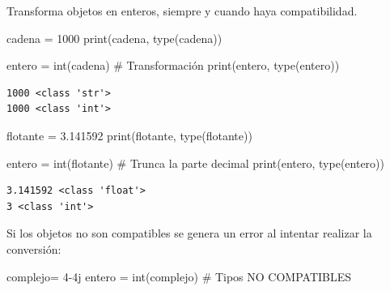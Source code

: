 \documentclass[
  spanish,
  letterpaper,
]{scrbook}
\newenvironment{Shaded}{\begin{snugshade}}{\end{snugshade}}
\newcommand{\BuiltInTok}[1]{\textcolor[rgb]{0.00,0.23,0.31}{#1}}
\newcommand{\CommentTok}[1]{\textcolor[rgb]{0.37,0.37,0.37}{#1}}
\newcommand{\DecValTok}[1]{\textcolor[rgb]{0.68,0.00,0.00}{#1}}
\newcommand{\FloatTok}[1]{\textcolor[rgb]{0.68,0.00,0.00}{#1}}
\newcommand{\NormalTok}[1]{\textcolor[rgb]{0.00,0.23,0.31}{#1}}
\newcommand{\OperatorTok}[1]{\textcolor[rgb]{0.37,0.37,0.37}{#1}}
\newcommand{\OtherTok}[1]{\textcolor[rgb]{0.00,0.23,0.31}{#1}}
\newcommand{\StringTok}[1]{\textcolor[rgb]{0.13,0.47,0.30}{#1}}
\theoremstyle{definition}
\theoremstyle{remark}
\begin{document}
Transforma objetos en enteros, siempre y cuando haya compatibilidad.

\begin{Shaded}
\begin{Highlighting}[]
\NormalTok{cadena }\OperatorTok{=} \StringTok{\textquotesingle{}1000\textquotesingle{}}
\BuiltInTok{print}\NormalTok{(cadena, }\BuiltInTok{type}\NormalTok{(cadena))}

\NormalTok{entero }\OperatorTok{=} \BuiltInTok{int}\NormalTok{(cadena) }\CommentTok{\# Transformación}
\BuiltInTok{print}\NormalTok{(entero, }\BuiltInTok{type}\NormalTok{(entero))}
\end{Highlighting}
\end{Shaded}

\begin{verbatim}
1000 <class 'str'>
1000 <class 'int'>
\end{verbatim}

\begin{Shaded}
\begin{Highlighting}[]
\NormalTok{flotante }\OperatorTok{=} \FloatTok{3.141592}
\BuiltInTok{print}\NormalTok{(flotante, }\BuiltInTok{type}\NormalTok{(flotante))}

\NormalTok{entero  }\OperatorTok{=} \BuiltInTok{int}\NormalTok{(flotante) }\CommentTok{\# Trunca la parte decimal}
\BuiltInTok{print}\NormalTok{(entero, }\BuiltInTok{type}\NormalTok{(entero))}
\end{Highlighting}
\end{Shaded}

\begin{verbatim}
3.141592 <class 'float'>
3 <class 'int'>
\end{verbatim}

Si los objetos no son compatibles se genera un error al intentar
realizar la conversión:

\begin{Shaded}
\begin{Highlighting}[]
\NormalTok{complejo}\OperatorTok{=} \DecValTok{4}\OperatorTok{{-}}\OtherTok{4j}
\NormalTok{entero }\OperatorTok{=} \BuiltInTok{int}\NormalTok{(complejo) }\CommentTok{\# Tipos NO COMPATIBLES}
\end{Highlighting}
\end{Shaded}
\end{document}

